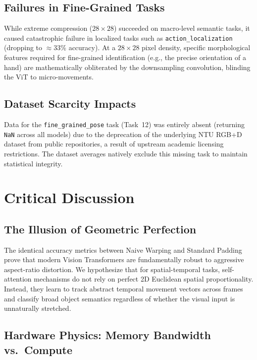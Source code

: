 \documentclass[conference]{IEEEtran}
\begin{document}
\subsection{Failures in Fine-Grained Tasks}

While extreme compression ($28{\times}28$) succeeded on macro-level
semantic tasks, it caused catastrophic failure in localized tasks such as
\texttt{action\_localization} (dropping to $\approx$33\% accuracy). At a
$28{\times}28$ pixel density, specific morphological features required for
fine-grained identification (e.g., the precise orientation of a hand) are
mathematically obliterated by the downsampling convolution, blinding the
ViT to micro-movements.

\subsection{Dataset Scarcity Impacts}

Data for the \texttt{fine\_grained\_pose} task (Task~12) was entirely
absent (returning \texttt{NaN} across all models) due to the deprecation
of the underlying NTU RGB+D dataset from public repositories, a result of
upstream academic licensing restrictions. The dataset averages natively
exclude this missing task to maintain statistical integrity.

\section{Critical Discussion}
\label{sec:discussion}

\subsection{The Illusion of Geometric Perfection}

The identical accuracy metrics between Naive Warping and Standard Padding
prove that modern Vision Transformers are fundamentally robust to
aggressive aspect-ratio distortion. We hypothesize that for
spatial-temporal tasks, self-attention mechanisms do not rely on perfect
2D Euclidean spatial proportionality. Instead, they learn to track
abstract temporal movement vectors across frames and classify broad object
semantics regardless of whether the visual input is unnaturally stretched.

\subsection{Hardware Physics: Memory Bandwidth vs.\ Compute}
\end{document}
